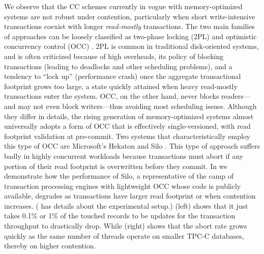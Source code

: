 We observe that the CC schemes currently in vogue with memory-optimized systems are not robust under contention, particularly when short write-intensive transactions coexist with longer \textit{read-mostly} transactions.
The two main families of approaches can be loosely classified as two-phase locking (2PL) \cite{GrayR92} and optimistic concurrency control (OCC) \cite{KungR81}. 2PL is common in traditional disk-oriented systems, and is often criticized because of high overheads, its policy of blocking transactions (leading to deadlocks and other scheduling problems), and a tendency to ``lock up'' (performance crash) once the aggregate transactional footprint grows too large, a state quickly attained when heavy read-mostly transactions enter the system. OCC, on the other hand, never blocks readers---and may not even block writers---thus avoiding most scheduling issues. Although they differ in details, the rising generation of memory-optimized systems almost universally adopts a form of OCC that is effectively single-versioned, with read footprint validation at pre-commit.  Two systems that characteristically employ this type of OCC are Microsoft's Hekaton \cite{LarsonBDFPZ11} and Silo \cite{TuZKLM13}. This type of approach suffers badly in highly concurrent workloads \cite{YuBPDS14} because transactions must abort if any portion of their read footprint is overwritten before they commit. 
In  we demonstrate how the performance of Silo, a representative of the camp of transaction processing engines with lightweight OCC whose code is publicly available, degrades as transactions have larger read footprint or when contention increases. ( has details about the experimental setup.) (left) shows that it just takes 0.1\% or 1\% of the touched records to be updates for the transaction throughput to drastically drop. While (right) shows that the abort rate grows quickly as the same number of threads operate on smaller TPC-C databases, thereby on higher contention.


